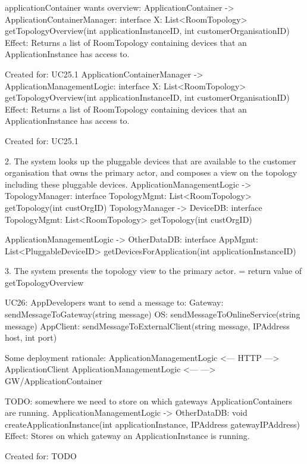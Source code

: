                 applicationContainer wants overview:
                    ApplicationContainer -> ApplicationContainerManager: interface X: List<RoomTopology> getTopologyOverview(int applicationInstanceID, int customerOrganisationID)
                        Effect: Returns a list of RoomTopology containing devices that an ApplicationInstance has access to.
                        \item Created for: UC25.1
                    ApplicationContainerManager -> ApplicationManagementLogic: interface X: List<RoomTopology> getTopologyOverview(int applicationInstanceID, int customerOrganisationID)
                        Effect: Returns a list of RoomTopology containing devices that an ApplicationInstance has access to.
                        \item Created for: UC25.1

            2. The system looks up the pluggable devices that are available to the customer organisation that owns the primary actor,
               and composes a view on the topology including these pluggable devices.
                    ApplicationManagementLogic -> TopologyManager: interface TopologyMgmt: List<RoomTopology> getTopology(int custOrgID)
                    TopologyManager -> DeviceDB: interface TopologyMgmt: List<RoomTopology> getTopology(int custOrgID)

                    ApplicationManagementLogic -> OtherDataDB: interface AppMgmt: List<PluggableDeviceID> getDevicesForApplication(int applicationInstanceID)

            3. The system presents the topology view to the primary actor.
                    = return value of getTopologyOverview

        UC26:
            AppDevelopers want to send a message to:
                Gateway:   sendMessageToGateway(string message)
                OS:        sendMessageToOnlineService(string message)
                AppClient: sendMessageToExternalClient(string message, IPAddress host, int port)

           Some deployment rationale: ApplicationManagementLogic <--- HTTP ---> ApplicationClient
                                      ApplicationManagementLogic <---      ---> GW/ApplicationContainer

           TODO: somewhere we need to store on which gateways ApplicationContainers are running.
                ApplicationManagementLogic -> OtherDataDB: void createApplicationInstance(int applicationInstance, IPAddress gatewayIPAddress)
                    Effect: Stores on which gateway an ApplicationInstance is running.
                    \item Created for: TODO

